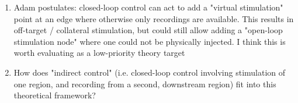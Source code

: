 
\begin{enumerate}
    \item Adam postulates: closed-loop control can act to add a "virtual stimulation" point at an edge where otherwise only recordings are available. This results in off-target / collateral stimulation, but could still allow adding a "open-loop stimulation node" where one could not be physically injected. I think this is worth evaluating as a low-priority theory target
    \item How does "indirect control" (i.e. closed-loop control involving stimulation of one region, and recording from a second, downstream region) fit into this theoretical framework?
\end{enumerate}{}